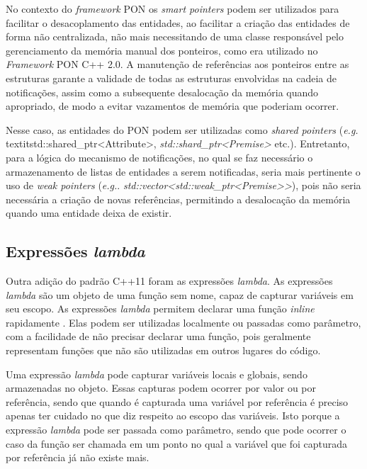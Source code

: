No contexto do \textit{framework} PON os \textit{smart pointers} podem ser
utilizados para facilitar o desacoplamento das entidades, ao facilitar a criação
das entidades de forma não centralizada, não mais necessitando de uma classe
responsável pelo gerenciamento da memória manual dos ponteiros, como era
utilizado no \textit{Framework} PON C++ 2.0. A manutenção de referências aos
ponteiros entre as estruturas garante a validade de todas as estruturas
envolvidas na cadeia de notificações, assim como a subsequente desalocação da
memória quando apropriado, de modo a evitar vazamentos de memória que poderiam
ocorrer.

Nesse caso, as entidades do PON podem ser utilizadas como \textit{shared
pointers} (\textit{e.g.} textit{std::shared\_ptr<Attribute>},
\textit{std::shard\_ptr<Premise>} etc.). Entretanto, para a lógica do mecanismo
de notificações, no qual se faz necessário o armazenamento de listas de
entidades a serem notificadas, seria mais pertinente o uso de \textit{weak
pointers} (\textit{e.g.}. \textit{std::vector<std::weak\_ptr<Premise>>}), pois
não seria necessária a criação de novas referências, permitindo a desalocação da
memória quando uma entidade deixa de existir.

\subsection{Expressões \textit{lambda}}

Outra adição do padrão C++11 foram as expressões \textit{lambda}. As expressões
\textit{lambda} são um objeto de uma função sem nome, capaz de capturar
variáveis em seu escopo. As expressões \textit{lambda} permitem declarar uma
função \textit{inline} rapidamente \cite{modern_cpp}. Elas podem ser utilizadas
localmente ou passadas como parâmetro, com a facilidade de não precisar declarar
uma função, pois geralmente representam funções que não são utilizadas em outros
lugares do código.

Uma expressão \textit{lambda} pode capturar variáveis locais e globais, sendo
armazenadas no objeto. Essas capturas podem ocorrer por valor ou por referência,
sendo que quando é capturada uma variável por referência é preciso apenas ter
cuidado no que diz respeito ao escopo das variáveis. Isto porque a expressão
\textit{lambda} pode ser passada como parâmetro, sendo que pode ocorrer o caso
da função ser chamada em um ponto no qual a variável que foi capturada por
referência já não existe mais.

